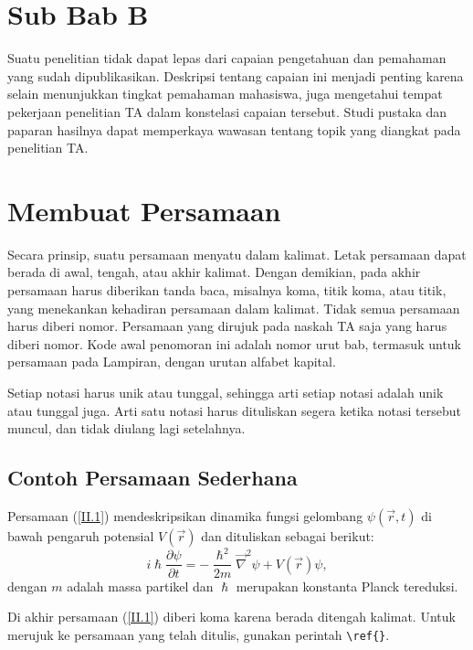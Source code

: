 \section{Sub Bab B}
\noindent Suatu penelitian tidak dapat lepas dari capaian pengetahuan dan pemahaman yang sudah dipublikasikan. Deskripsi tentang capaian ini menjadi penting karena selain menunjukkan tingkat pemahaman mahasiswa, juga mengetahui tempat pekerjaan penelitian TA dalam konstelasi capaian tersebut. Studi pustaka dan paparan hasilnya dapat memperkaya wawasan tentang topik yang diangkat pada penelitian TA.

\section{Membuat Persamaan}
\noindent Secara prinsip, suatu persamaan menyatu dalam kalimat. Letak persamaan dapat berada di awal, tengah, atau akhir kalimat. Dengan demikian, pada akhir persamaan harus diberikan tanda baca, misalnya koma, titik koma, atau titik, yang menekankan kehadiran persamaan dalam kalimat. Tidak semua persamaan harus diberi nomor. Persamaan yang dirujuk pada naskah TA saja yang harus diberi nomor. Kode awal penomoran ini adalah nomor urut bab, termasuk untuk persamaan pada Lampiran, dengan urutan alfabet kapital.

Setiap notasi harus unik atau tunggal, sehingga arti setiap notasi adalah unik atau tunggal juga. Arti satu notasi harus dituliskan segera ketika notasi tersebut muncul, dan tidak diulang lagi setelahnya.

\subsection{Contoh Persamaan Sederhana}
Persamaan (\ref{II.1}) mendeskripsikan dinamika fungsi gelombang $\psi(\vec{r},t)$ di bawah pengaruh potensial $V(\vec{r})$ dan dituliskan sebagai berikut:
\begin{equation}\label{II.1}
  i\hslash\frac{\partial \psi}{\partial t} = -\frac{\hslash^2}{2 m}\Vec{\nabla}^2 \psi + V(\vec{r})\psi,
\end{equation}
dengan $m$ adalah massa partikel dan $\hslash$ merupakan konstanta Planck tereduksi.

Di akhir persamaan (\ref{II.1}) diberi koma karena berada ditengah kalimat. Untuk merujuk ke persamaan yang telah ditulis, gunakan perintah \verb|\ref{}|.

